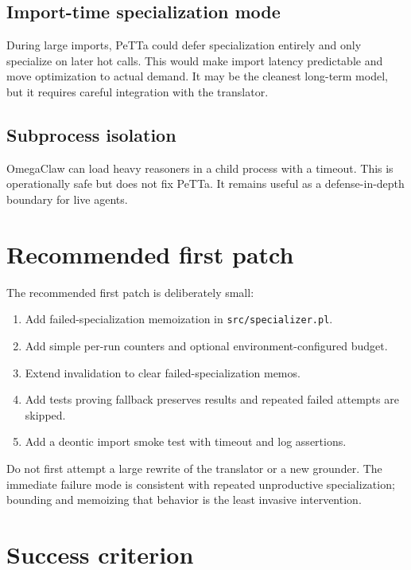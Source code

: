 \documentclass[11pt]{article}
\begin{document}
\subsection{Import-time specialization mode}

During large imports, PeTTa could defer specialization entirely and only specialize on later hot calls. This would make import latency predictable and move optimization to actual demand. It may be the cleanest long-term model, but it requires careful integration with the translator.

\subsection{Subprocess isolation}

OmegaClaw can load heavy reasoners in a child process with a timeout. This is operationally safe but does not fix PeTTa. It remains useful as a defense-in-depth boundary for live agents.

\section{Recommended first patch}

The recommended first patch is deliberately small:

\begin{enumerate}[nosep]
\item Add failed-specialization memoization in \texttt{src/specializer.pl}.
\item Add simple per-run counters and optional environment-configured budget.
\item Extend invalidation to clear failed-specialization memos.
\item Add tests proving fallback preserves results and repeated failed attempts are skipped.
\item Add a deontic import smoke test with timeout and log assertions.
\end{enumerate}

Do not first attempt a large rewrite of the translator or a new grounder. The immediate failure mode is consistent with repeated unproductive specialization; bounding and memoizing that behavior is the least invasive intervention.

\section{Success criterion}
\end{document}
